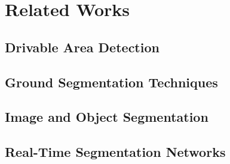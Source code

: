 %
%
% 
% 
% 



\chapter{Related Works}
\label{chap:Style}
\section{Drivable Area Detection}
\section{Ground Segmentation Techniques}
\section{Image and Object Segmentation}
\section{Real-Time Segmentation Networks}


